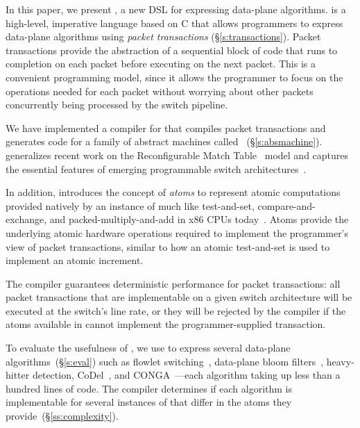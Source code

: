 In this paper, we present \pktlanguage, a new DSL for expressing data-plane
algorithms. \pktlanguage is a high-level, imperative language based on C that
allows programmers to express data-plane algorithms using {\em packet
transactions} (\S\ref{s:transactions}). Packet transactions provide the
abstraction of a sequential block of code that runs to completion on each
packet before executing on the next packet. This is a convenient programming
model, since it allows the programmer to focus on the operations needed for
each packet without worrying about other packets concurrently being processed
by the switch pipeline.

We have implemented a compiler for \pktlanguage that compiles \pktlanguage
packet transactions and generates code for a family of abstract machines called
\absmachine~(\S\ref{s:absmachine}). \absmachine generalizes recent work on the
Reconfigurable Match Table~\cite{rmt} model and captures the essential features
of emerging programmable switch architectures~\cite{rmt, xpliant, flexpipe}.

In addition, \absmachine introduces the concept of {\em atoms} to represent
atomic computations provided natively by an instance of \absmachine much like
test-and-set, compare-and-exchange, and packed-multiply-and-add in x86 CPUs
today~\cite{x86_manual}.  Atoms provide the underlying atomic hardware
operations required to implement the programmer's view of packet transactions,
similar to how an atomic test-and-set is used to implement an atomic increment.

The \pktlanguage compiler guarantees deterministic performance for packet
transactions: all packet transactions that are implementable on a given switch
architecture will be executed at the switch's line rate, or they will be
rejected by the compiler if the atoms available in \absmachine cannot implement
the programmer-supplied transaction.

To evaluate the usefulness of \pktlanguage, we use \pktlanguage to express
several data-plane algorithms~(\S\ref{s:eval}) such as flowlet
switching~\cite{flowlets}, data-plane bloom filters~\cite{bloom}, heavy-hitter
detection, CoDel~\cite{codel}, and CONGA~\cite{conga}---each algorithm taking
up less than a hundred lines of \pktlanguage code.  The \pktlanguage compiler
determines if each algorithm is implementable for several instances of
\absmachine that differ in the atoms they provide~(\S\ref{ss:complexity}).
